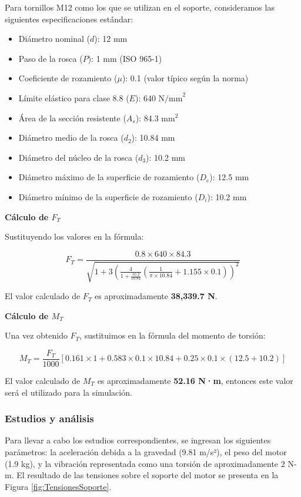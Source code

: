 \documentclass[14pt,oneside]{extarticle} %
\begin{document}
Para tornillos M12 como los que se utilizan en el soporte, consideramos las siguientes especificaciones estándar:
\begin{itemize}
    \item Diámetro nominal (\( d \)): 12 mm
    \item Paso de la rosca (\( P \)): 1 mm (ISO 965-1)
    \item Coeficiente de rozamiento (\( \mu \)): 0.1 (valor típico según la norma)
    \item Límite elástico para clase 8.8 (\( E \)): 640 \( \text{N/mm}^2 \)
    \item Área de la sección resistente (\( A_s \)): 84.3 \( \text{mm}^2 \)
    \item Diámetro medio de la rosca (\( d_2 \)): 10.84 mm
    \item Diámetro del núcleo de la rosca (\( d_3 \)): 10.2 mm
    \item Diámetro máximo de la superficie de rozamiento (\( D_e \)): 12.5 mm
    \item Diámetro mínimo de la superficie de rozamiento (\( D_i \)): 10.2 mm
\end{itemize}

\textbf{Cálculo de \( F_T \)}

Sustituyendo los valores en la fórmula:

\[
F_T = \frac{0.8 \times 640 \times 84.3}{\sqrt{1 + 3 \left( \frac{4}{1 + \frac{10.2}{10.84}} \left( \frac{1}{\pi \times 10.84} + 1.155 \times 0.1 \right) \right)^2}}
\]

El valor calculado de \( F_T \) es aproximadamente \textbf{38,339.7 N}.

\textbf{Cálculo de \( M_T \)}

Una vez obtenido \( F_T \), sustituimos en la fórmula del momento de torsión:

\[
M_T = \frac{F_T}{1000} \left[ 0.161 \times 1 + 0.583 \times 0.1 \times 10.84 + 0.25 \times 0.1 \times (12.5 + 10.2) \right]
\]

El valor calculado de \( M_T \) es aproximadamente \textbf{52.16 N·m}, entonces este valor será el utilizado para la simulación.

\subsubsection{Estudios y análisis}

Para llevar a cabo los estudios correspondientes, se ingresan los siguientes parámetros: la aceleración debida a la gravedad (9.81 m/s²), el peso del motor (1.9 kg), y la vibración representada como una torsión de aproximadamente 2 N-m. El resultado de las tensiones sobre el soporte del motor se presenta en la Figura \ref{fig:TensionesSoporte}.
\end{document}
